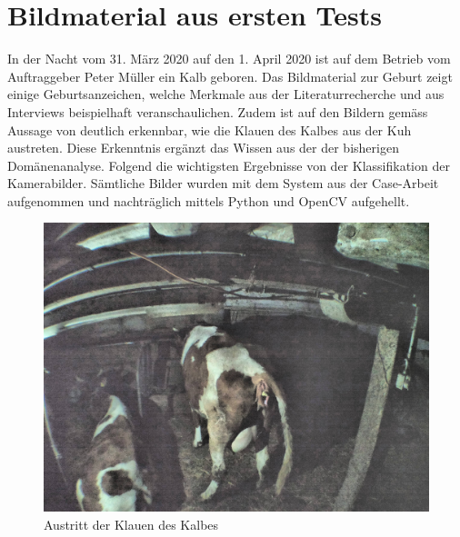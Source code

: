
\section{Bildmaterial aus ersten Tests}

In der Nacht vom 31. März 2020 auf den 1. April 2020 ist auf dem Betrieb vom Auftraggeber Peter Müller ein Kalb geboren. Das Bildmaterial zur Geburt zeigt einige Geburtsanzeichen, welche Merkmale aus der Literaturrecherche und aus Interviews beispielhaft veranschaulichen. Zudem ist auf den Bildern gemäss Aussage von \citep{Muller2020a} deutlich erkennbar, wie die Klauen des Kalbes aus der Kuh austreten. Diese Erkenntnis ergänzt das Wissen aus der der bisherigen Domänenanalyse. Folgend die wichtigsten Ergebnisse von der Klassifikation der Kamerabilder. Sämtliche Bilder wurden mit dem System aus der Case-Arbeit aufgenommen und nachträglich mittels Python und OpenCV aufgehellt. \\





\begin{figure}[h]
	\center
	\includegraphics[scale=0.6]{Grafiken/austrittklauen.jpg}
	\caption{Austritt der Klauen des Kalbes \citep{Muller2020a}} 
	\label{fig: Austritt der Klauen des Kalbes}
\end{figure}


